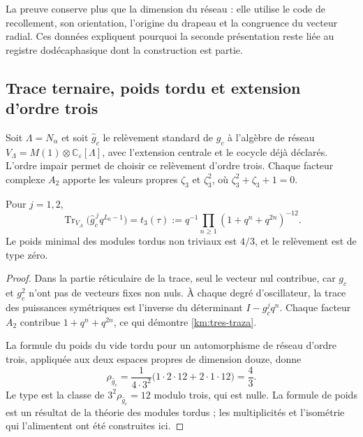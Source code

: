 La preuve conserve plus que la dimension du réseau : elle utilise le code de recollement, son orientation, l'origine du drapeau et la congruence du vecteur radial. Ces données expliquent pourquoi la seconde présentation reste liée au registre dodécaphasique dont la construction est partie.

\subsection{Trace ternaire, poids tordu et extension d'ordre trois}
\label{km:orbifold-tres}

Soit \(\Lambda=N_\alpha\) et soit \(\widehat g_c\) le relèvement
standard de \(g_c\) à l'algèbre de réseau
\(V_\Lambda=M(1)\otimes\mathbb C_\varepsilon[\Lambda]\), avec
l'extension centrale et le cocycle déjà déclarés. L'ordre impair permet
de choisir ce relèvement d'ordre trois. Chaque facteur complexe \(A_2\)
apporte les valeurs propres \(\zeta_3\) et \(\zeta_3^2\), où
\(\zeta_3^2+\zeta_3+1=0\).

\begin{proposition}
\label{km:traza-tipo}
Pour \(j=1,2\),
\begin{equation}
 \operatorname{Tr}_{V_\Lambda}
       \bigl(\widehat g_c^{\,j}q^{L_0-1}\bigr)
 =t_3(\tau)
 :=q^{-1}\prod_{n\ge1}(1+q^n+q^{2n})^{-12}.
 \label{km:tres-traza}
\end{equation}
Le poids minimal des modules tordus non triviaux est \(4/3\), et
le relèvement est de type zéro.
\end{proposition}
\begin{proof}
Dans la partie réticulaire de la trace, seul le vecteur nul contribue,
car \(g_c\) et \(g_c^2\) n'ont pas de vecteurs fixes non nuls.
À chaque degré d'oscillateur, la trace des puissances symétriques est l'inverse
du déterminant \(I-g_c^jq^n\). Chaque facteur \(A_2\) contribue
\(1+q^n+q^{2n}\), ce qui démontre \eqref{km:tres-traza}.

La formule du poids du vide tordu pour un automorphisme de réseau d'ordre trois, appliquée aux deux espaces propres de dimension douze, donne
\[
 \rho_{\widehat g_c}
 =\frac{1}{4\cdot3^2}
   \bigl(1\cdot2\cdot12+2\cdot1\cdot12\bigr)=\frac43.
\]
Le type est la classe de \(3^2\rho_{\widehat g_c}=12\) modulo
trois, qui est nulle. La formule de poids est un résultat de la théorie des
modules tordus ; les multiplicités et l'isométrie qui l'alimentent
ont été construites ici.
\end{proof}

